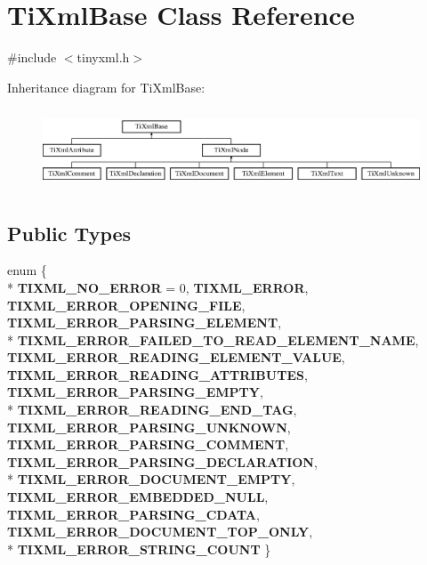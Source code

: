 \hypertarget{class_ti_xml_base}{\section{Ti\-Xml\-Base Class Reference}
\label{class_ti_xml_base}
}


{\ttfamily \#include $<$tinyxml.\-h$>$}

Inheritance diagram for Ti\-Xml\-Base\-:\begin{figure}[H]
\begin{center}
\leavevmode
\includegraphics[height=2.413793cm]{class_ti_xml_base}
\end{center}
\end{figure}
\subsection*{Public Types}
\begin{DoxyCompactItemize}
\item 
enum \{ \\*
{\bfseries T\-I\-X\-M\-L\-\_\-\-N\-O\-\_\-\-E\-R\-R\-O\-R} = 0, 
{\bfseries T\-I\-X\-M\-L\-\_\-\-E\-R\-R\-O\-R}, 
{\bfseries T\-I\-X\-M\-L\-\_\-\-E\-R\-R\-O\-R\-\_\-\-O\-P\-E\-N\-I\-N\-G\-\_\-\-F\-I\-L\-E}, 
{\bfseries T\-I\-X\-M\-L\-\_\-\-E\-R\-R\-O\-R\-\_\-\-P\-A\-R\-S\-I\-N\-G\-\_\-\-E\-L\-E\-M\-E\-N\-T}, 
\\*
{\bfseries T\-I\-X\-M\-L\-\_\-\-E\-R\-R\-O\-R\-\_\-\-F\-A\-I\-L\-E\-D\-\_\-\-T\-O\-\_\-\-R\-E\-A\-D\-\_\-\-E\-L\-E\-M\-E\-N\-T\-\_\-\-N\-A\-M\-E}, 
{\bfseries T\-I\-X\-M\-L\-\_\-\-E\-R\-R\-O\-R\-\_\-\-R\-E\-A\-D\-I\-N\-G\-\_\-\-E\-L\-E\-M\-E\-N\-T\-\_\-\-V\-A\-L\-U\-E}, 
{\bfseries T\-I\-X\-M\-L\-\_\-\-E\-R\-R\-O\-R\-\_\-\-R\-E\-A\-D\-I\-N\-G\-\_\-\-A\-T\-T\-R\-I\-B\-U\-T\-E\-S}, 
{\bfseries T\-I\-X\-M\-L\-\_\-\-E\-R\-R\-O\-R\-\_\-\-P\-A\-R\-S\-I\-N\-G\-\_\-\-E\-M\-P\-T\-Y}, 
\\*
{\bfseries T\-I\-X\-M\-L\-\_\-\-E\-R\-R\-O\-R\-\_\-\-R\-E\-A\-D\-I\-N\-G\-\_\-\-E\-N\-D\-\_\-\-T\-A\-G}, 
{\bfseries T\-I\-X\-M\-L\-\_\-\-E\-R\-R\-O\-R\-\_\-\-P\-A\-R\-S\-I\-N\-G\-\_\-\-U\-N\-K\-N\-O\-W\-N}, 
{\bfseries T\-I\-X\-M\-L\-\_\-\-E\-R\-R\-O\-R\-\_\-\-P\-A\-R\-S\-I\-N\-G\-\_\-\-C\-O\-M\-M\-E\-N\-T}, 
{\bfseries T\-I\-X\-M\-L\-\_\-\-E\-R\-R\-O\-R\-\_\-\-P\-A\-R\-S\-I\-N\-G\-\_\-\-D\-E\-C\-L\-A\-R\-A\-T\-I\-O\-N}, 
\\*
{\bfseries T\-I\-X\-M\-L\-\_\-\-E\-R\-R\-O\-R\-\_\-\-D\-O\-C\-U\-M\-E\-N\-T\-\_\-\-E\-M\-P\-T\-Y}, 
{\bfseries T\-I\-X\-M\-L\-\_\-\-E\-R\-R\-O\-R\-\_\-\-E\-M\-B\-E\-D\-D\-E\-D\-\_\-\-N\-U\-L\-L}, 
{\bfseries T\-I\-X\-M\-L\-\_\-\-E\-R\-R\-O\-R\-\_\-\-P\-A\-R\-S\-I\-N\-G\-\_\-\-C\-D\-A\-T\-A}, 
{\bfseries T\-I\-X\-M\-L\-\_\-\-E\-R\-R\-O\-R\-\_\-\-D\-O\-C\-U\-M\-E\-N\-T\-\_\-\-T\-O\-P\-\_\-\-O\-N\-L\-Y}, 
\\*
{\bfseries T\-I\-X\-M\-L\-\_\-\-E\-R\-R\-O\-R\-\_\-\-S\-T\-R\-I\-N\-G\-\_\-\-C\-O\-U\-N\-T}
 \}
\end{DoxyCompactItemize}
